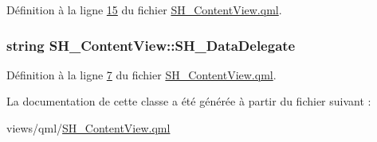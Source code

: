 Définition à la ligne \hyperlink{SH__ContentView_8qml_source_l00015}{15} du fichier \hyperlink{SH__ContentView_8qml_source}{S\-H\-\_\-\-Content\-View.\-qml}.

\hypertarget{classSH__ContentView_a61539dec6a9f22a4bab8fad98231e549}{
\subsubsection[{S\-H\-\_\-\-Data\-Delegate}]{\setlength{\rightskip}{0pt plus 5cm}string S\-H\-\_\-\-Content\-View\-::\-S\-H\-\_\-\-Data\-Delegate}}\label{classSH__ContentView_a61539dec6a9f22a4bab8fad98231e549}


Définition à la ligne \hyperlink{SH__ContentView_8qml_source_l00007}{7} du fichier \hyperlink{SH__ContentView_8qml_source}{S\-H\-\_\-\-Content\-View.\-qml}.



La documentation de cette classe a été générée à partir du fichier suivant \-:\begin{DoxyCompactItemize}
\item 
views/qml/\hyperlink{SH__ContentView_8qml}{S\-H\-\_\-\-Content\-View.\-qml}\end{DoxyCompactItemize}
